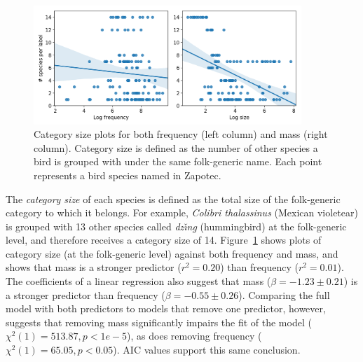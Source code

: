 \documentclass[10pt,letterpaper]{article}
\begin{document}
\begin{figure}[!ht]
  \begin{center}
    \includegraphics[width=0.90\textwidth]{./figures/ssrr-singlespecies.png}
    \vspace{-0.1in}
        \caption{Category size plots for both frequency (left column) and mass (right column). Category size is defined as the number of other species a bird is grouped with under the same folk-generic name. Each point represents a bird species named in Zapotec.}
        \label{fig-ssrr}
  \end{center}
\end{figure}

The \emph{category size} of each species is defined as the total size of the folk-generic category to which it belongs. For example, \emph{ Colibri thalassinus} (Mexican violetear) is grouped with 13 other species called \textit{dz\v{\i}n\b{g}} (hummingbird) at the folk-generic level, and therefore receives a category size of 14.  Figure~\ref{fig-ssrr} shows plots of category size (at the folk-generic level) against both frequency and mass, and shows that mass is a stronger predictor ($r^2 = 0.20$) than frequency ($r^2 = 0.01$). The coefficients of a linear regression also suggest that mass ($\beta = -1.23 \pm 0.21$) is a stronger predictor than frequency ($\beta = -0.55 \pm 0.26$). Comparing the full model with both predictors to models that remove one predictor, however, suggests that removing mass significantly impairs the fit of the model ($\chi^{2}(1) = 513.87, p < 1e-5$), as does removing frequency ($\chi^{2}(1) = 65.05, p < 0.05$). AIC values support this same conclusion.
\end{document}
